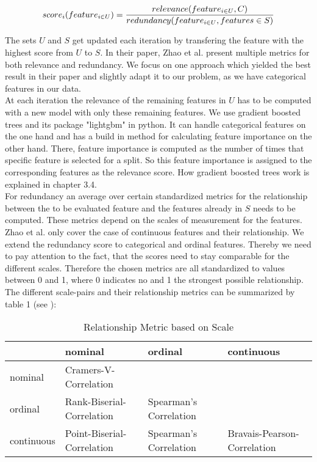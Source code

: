 \documentclass[12pt,titlepage]{article}
\begin{document}
\begin{equation} \label{score_raw}
    score_{i}(feature_{i \in U}) = \frac{relevance(feature_{i \in U}, C)}{redundancy(feature_{i \in U}, features \in S)} \\
\end{equation}

The sets $U$ and $S$ get updated each iteration by transfering the feature with the highest score from $U$ to $S$. In their paper, Zhao et al. present multiple metrics for both relevance and redundancy. We focus on one approach which yielded the best result in their paper and slightly adapt it to our problem, as we have categorical features in our data. \\
At each iteration the relevance of the remaining features in $U$ has to be computed with a new model with only these remaining features. We use gradient boosted trees and its package "lightgbm" in python. It can handle categorical features on the one hand and has a build in method for calculating feature importance on the other hand. There, feature importance is computed as the number of times that specific feature is selected for a split. So this feature importance is assigned to the corresponding features as the relevance score. How gradient boosted trees work is explained in chapter 3.4. \\
For redundancy an average over certain standardized metrics for the relationship between the to be evaluated feature and the features already in $S$ needs to be computed. These metrics depend on the scales of measurement for the features. Zhao et al. only cover the case of continuous features and their relationship. We extend the redundancy score to categorical and ordinal features. Thereby we need to pay attention to the fact, that the scores need to stay comparable for the different scales. Therefore the chosen metrics are all standardized to values between 0 and 1, where 0 indicates no and 1 the strongest possible relationship. The different scale-pairs and their relationship metrics can be summarized by table 1 (see \cite{correlation}): \\

\setlength{\tabcolsep}{10pt} %
\renewcommand{\arraystretch}{1.5}

\begin{table}
    \centering
    \caption{Relationship Metric based on Scale}
    \begin{tabular}{l|l|l|l}
    \diagbox{}{} & nominal & ordinal & continuous      \\
    \hline
    nominal                & Cramers-V-Correlation &         &                 \\
    \hline
    ordinal                & Rank-Biserial-Correlation & Spearman's Correlation &                 \\
    \hline
    continuous             & Point-Biserial-Correlation & Spearman's Correlation & Bravais-Pearson-Correlation
\end{tabular}
\end{table}
\end{document}
